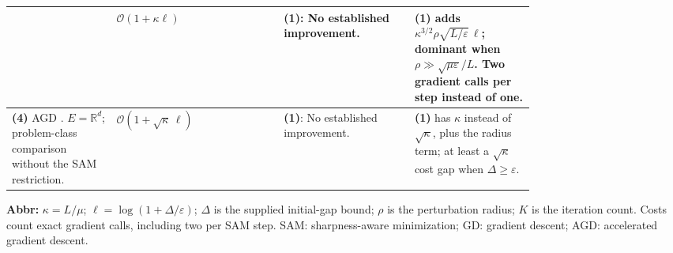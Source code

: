 \begin{table}[tp]
\begin{threeparttable}
\begin{tabularx}{\linewidth}{@{}>{\raggedright\arraybackslash}p{0.20\linewidth}>{\raggedright\arraybackslash}p{0.32\linewidth}>{\raggedright\arraybackslash}p{0.25\linewidth}>{\raggedright\arraybackslash}X@{}}
& $\mathcal{O}(1+\kappa\ell)$
& \textbf{(1)}: No established improvement.
& \textbf{(1)} adds $\kappa^{3/2}\rho\sqrt{L/\varepsilon}\,\ell$; dominant when $\rho\gg\sqrt{\mu\varepsilon}/L$. Two gradient calls per step instead of one. \\
\midrule
\textbf{(4)} AGD \citep[\S2.2, Thm.~2.2.1, Lem.~2.2.4]{nsscNesterov2018}. $E=\mathbb{R}^d$; problem-class comparison without the SAM restriction.
& $\mathcal{O}(1+\sqrt{\kappa}\,\ell)$
& \textbf{(1)}: No established improvement.
& \textbf{(1)} has $\kappa$ instead of $\sqrt{\kappa}$, plus the radius term; at least a $\sqrt{\kappa}$ cost gap when $\Delta\geq\varepsilon$. \\
\bottomrule
\end{tabularx}
\begin{tablenotes}[flushleft]\footnotesize
\item[] \textbf{Abbr:} $\kappa=L/\mu$; $\ell=\log(1+\Delta/\varepsilon)$; $\Delta$ is the supplied initial-gap bound; $\rho$ is the perturbation radius; $K$ is the iteration count. Costs count exact gradient calls, including two per SAM step. SAM: sharpness-aware minimization; GD: gradient descent; AGD: accelerated gradient descent.
\end{tablenotes}
\end{threeparttable}
\end{table}
\clearpage
